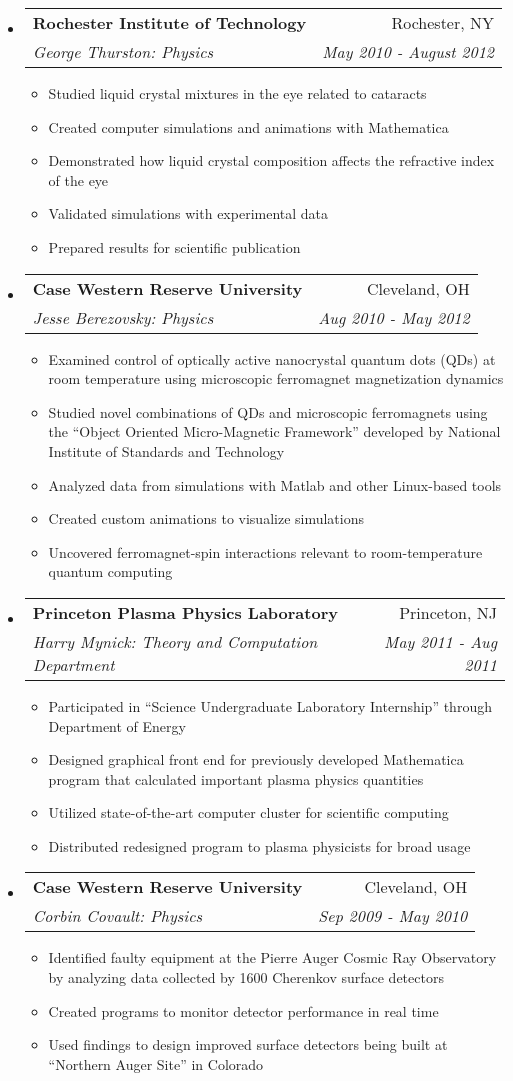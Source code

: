 \documentclass[letterpaper,11pt]{article}
\makeatletter
\newcommand{\resitem}[1]{\item #1 \vspace{-2pt}}
\newcommand{\ressubheading}[4]{\vspace{-14pt}
\begin{tabular*}{7.0in}{l@{\extracolsep{\fill}}r}
		\\
		\textbf{#1} & #2 \\
		\textit{#3} & \textit{#4} \\
\end{tabular*}\vspace{-6pt}}
\makeatother
\begin{document}
\begin{itemize}
	
\item
	\ressubheading{Rochester Institute of Technology}{Rochester, NY}{George Thurston: Physics}{May 2010 - August 2012}
	\begin{itemize}
		\resitem{Studied liquid crystal mixtures in the eye related to cataracts}
		\resitem{Created computer simulations and animations with Mathematica}
		\resitem{Demonstrated how liquid crystal composition affects the refractive index of the eye}
	 	\resitem{Validated simulations with experimental data}
	 	\resitem{Prepared results for scientific publication}
	\end{itemize}	
	
\item
	\ressubheading{Case Western Reserve University}{Cleveland, OH}{Jesse Berezovsky: Physics}{Aug 2010 - May 2012}
	\begin{itemize}
		\resitem{Examined control of optically active nanocrystal quantum dots (QDs) at room temperature using microscopic ferromagnet magnetization dynamics}
		\resitem{Studied novel combinations of QDs and microscopic ferromagnets using the ``Object Oriented Micro-Magnetic Framework'' developed by National Institute of Standards and Technology}
		\resitem{Analyzed data from simulations with Matlab and other Linux-based tools}
		\resitem{Created custom animations to visualize simulations}
		\resitem{Uncovered ferromagnet-spin interactions relevant to room-temperature quantum computing}
		
	\end{itemize}
\item
	\ressubheading{Princeton Plasma Physics Laboratory}{Princeton, NJ}{Harry Mynick: Theory and Computation Department}{May 2011 - Aug 2011}
	\begin{itemize}	
		\resitem{Participated in ``Science Undergraduate Laboratory Internship'' through Department of Energy}
		\resitem{Designed graphical front end for previously developed Mathematica program that calculated important plasma physics quantities}
		\resitem{Utilized state-of-the-art computer cluster for scientific computing}
		\resitem{Distributed redesigned program to plasma physicists for broad usage}		
	\end{itemize}	

\item
	\ressubheading{Case Western Reserve University}{Cleveland, OH}{Corbin Covault: Physics}{Sep 2009 - May 2010}
	\begin{itemize}
		\resitem{Identified faulty equipment at the Pierre Auger Cosmic Ray Observatory by analyzing data collected by 1600 Cherenkov surface detectors}
		\resitem{Created programs to monitor detector performance in real time} 
		\resitem{Used findings to design improved surface detectors being built at ``Northern Auger Site'' in Colorado}
	\end{itemize}


\end{itemize}
\end{document}
